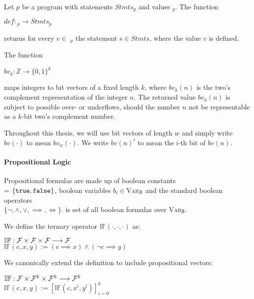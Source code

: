\begin{definition}
    Let $p$ be a program with statements $Stmts_p$ and values \val$_p$. The function
    \begin{center}
        $def: $\val$_p \longrightarrow Stmts_p$
    \end{center}
    returns for every $v \in$ \val$_p$ the statement $s \in Stmts$, where the value $v$ is defined.
\end{definition}

\begin{definition}
    The function
    \begin{center}
        $bv_k: \mathbb{Z} \longrightarrow \{0, 1\}^k$
    \end{center}
    maps integers to bit vectors of a fixed length $k$, where $bv_k(n)$ is the two's complement representation of the integer $n$.
    The returned value $bv_k(n)$ is subject to possible over- or underflows, should the number $n$ not be representable as a $k$-bit two's complement number.

    Throughout this thesis, we will use bit vectors of length $w$ and simply write $bv(\cdot)$ to mean $bv_w(\cdot)$. We write $bv(n)^i$ to mean the i-th bit of $bv(n)$.
\end{definition}

\paragraph{Propositional Logic}
Propositional formulas are made up of boolean constants \\ \bool = $\{ \mathtt{true}, \mathtt{false} \}$, boolean variables $b_i \in $\textsc{Var}$_{\mathbb{B}}$ and the standard boolean operators \\$\{ \lnot, \land, \lor, \implies, \iff \}$. \bform is set of all boolean formulas over \textsc{Var}$_{\mathbb{B}}$.

\begin{definition}
    We define the ternary operator $\mathbb{IF}(\cdot, \cdot, \cdot)$ as:
    \begin{center}
        $\mathbb{IF}: \mathcal{F} \times \mathcal{F} \times \mathcal{F} \longrightarrow \mathcal{F}$\\
        $\mathbb{IF}(c, x, y) := (c \implies x) \land (\lnot c \implies y)$
    \end{center}
    We canonically extend the definition to include propositional vectors:
    \begin{center}
        $\mathbb{IF}: \mathcal{F} \times \mathcal{F}^k \times \mathcal{F}^k \longrightarrow \mathcal{F}^k$\\
        $\mathbb{IF}(c, x, y) := [\mathbb{IF}(c, x^i, y^i)]_{i = 0}^k$
    \end{center}
\end{definition}

